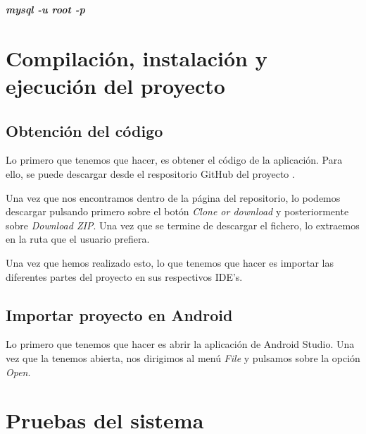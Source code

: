 \begin{center}
	\textbf{\textit{mysql -u root -p}}
\end{center}


\newpage

\section{Compilación, instalación y ejecución del proyecto}

\subsection{Obtención del código}

Lo primero que tenemos que hacer, es obtener el código de la aplicación. Para ello, se puede descargar desde el respositorio GitHub del proyecto \cite{github:ubuassistant}.

Una vez que nos encontramos dentro de la página del repositorio, lo podemos descargar pulsando primero sobre el botón \textit{Clone or download} y posteriormente sobre \textit{Download ZIP}. Una vez que se termine de descargar el fichero, lo extraemos en la ruta que el usuario prefiera.


Una vez que hemos realizado esto, lo que tenemos que hacer es importar las diferentes partes del proyecto en sus respectivos IDE's.

\subsection{Importar proyecto en Android}

Lo primero que tenemos que hacer es abrir la aplicación de Android Studio. Una vez que la tenemos abierta, nos dirigimos al menú \textit{File} y pulsamos sobre la opción \textit{Open}.

\section{Pruebas del sistema}
